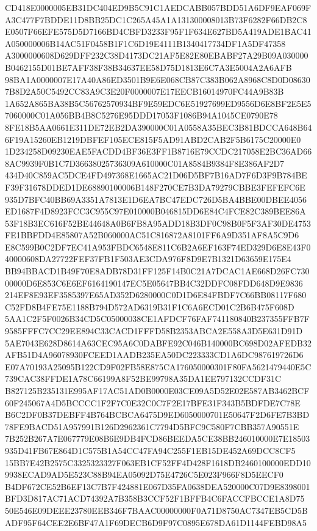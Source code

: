 \documentclass[UTF8,fontset=fandol,zihao=-4,a4paper]{ctexart}
\begin{document}
{{CD418E0000005EB31DC404ED9B5C91C1AEDCABB057BDD51A6DF9EAF069FA3C477F7BDDE11D8BB25DC1C265A45A1A131300008013B73F6282F66DB2C8
E0507F66EFE575D5D7166BD4CBFD3233F95F1F634E627BD5A419ADE1BAC41A050000006B14AC51F0458B1F1C6D19E4111B1340417734DF1A5DF47358
A3000000608D629DFF232C38D4173DC21AF5E82E80EBABF27A29B09A030000B0462155D01BE7AFF38F38B34637EE58D75D1813E6C7A3E5004A2A6AFB
98BA1A0000007E17A40A86ED3501B9E6E068CB87C383B062A8968C8D0D086307B8D2A50C5492CC83A9C3E20F0000007E17EECB16014970FC44A9B83B
1A652A865BA38B5C56762570934BF9E59EDC6E51927699ED9556D6E8BF2E5E57060000C01A056BB4B8C5276E95DDD17053F1086B94A1045CE0790E78
8FE18B5AA0661E311DE72EB2DA390000C01A0558A35BEC3B81BDCCA648B646F19A15260EB1219DBFEF105ECE815F5AD91ABD2CAB2F5B6175C20000E0
1D234258D09230EAE5FACDD4BF36E3FF1B8716E79CCDC217058E2BC36AD668AC9939F0B1C7D36638025736309A610000C01A8584B9384F8E386AF2D7
434D40C859AC5DCE4FD497368E1665AC21D06D5BF7B16AD7F6D3F9B784BEF39F31678DDED1DE68890100006B148F270CE7B3DA79279CBBE3FEFEFC6E
935D7BFC40BB69A3351A7813E1D6EA7BC47EDC726D5BA4BBE00DBEE4056ED1687F4D8923FCC3C955C97E010000B046815DD6E84C4FCE82C389BEE86A
53F18B3EC616F52BE44648A0B6FB8A95ADD18B3DF0C98B0F5F3AF30DE4753FE1BBFDD4E85807A52B060000AC51C816872A8101FF6A9D351AF8A5C9D6
E8C599B0C2DF7EC41A953FBDC6548E811C6B2A6EF163F74ED329D6E8E43F040000608DA27722FEF37FB1F503AE3CDA976F8D9E7B1321D63659E175E4
BB94BBACD1B49F70E8ADB78D31FF125F14B0C21A7DCAC1AE668D26FC73000000D6E853C6E6EF6164190147EC5E05647BB4C32DDFC08FDD648D9E9836
214EF8E93EF3585397E65AD352D6280000C0D1D6E84FBDF7C66BB08117F680C52FD8B4FE75E1188B794D572AD6319B31F1C6A6ECD01C2B6B475F608D
5AA1C2F5F0026B34CD5C05000038CE1AFDCF76FAF741180840B237355FFB7F9585FFFC7CC29EE894C33CACD1FFFD58B2353ABCA2E558A3D5E631D91D
5AE7043E628D8614A63CEC95A6C0DABFE92C046B140000BC698D02AFEDB32AFB51D4A96078930FCEED1AADB235EA50DC223333CD1A6DC987619726D6
E07A70193A25095B122CD9F02FB58E875CA176050000301F80FA5621479440E5C739CAC38FFDE1A78C66199A8F52BE99798A35DA1EE797132CCDF31C
B827125B235131E995AF17AC51AD0B0000E03CE09A5D52E02E587AB3462BCF60F245067A4D5BCCCC1F2F7C0E32C0C7F2E17BFE31F343B5BDFDE7C78E
B6C2DF0B37DEBFF4B764BCBCA6475D9ED6050000701E50647F2D6FE7B3BD78FE9BACD51A957991B126D2962361C7794D5BFC9C580F7CBB357A90551E
7B252B267A7E067779E08B6E9DB4FCD86BEEDA5CE38BB246010000E7E18503935D41FB67E864D1C575B1A54CC47FA94C255F1EB15DE452A69DCC8CF5
15BB7E42B2575C3325323327F063EB1CF52FF4D428F1618DB2460100000EDD109938ECAD9AD5E523C88B94EA05092D75E4726C5E023F966F8D5EECF0
B4DF672CE52B6EF13C7B7F424881E067D35FA0638DEA520000C07D9E8398001BFD3D817AC71ACD74392A7B358B3CCF52F1BFFB4C6FACCFBCCE1A8D75
50E546E09DEEE23780EEB346F7BAAC00000000F0A71D8750AC7347EB5CD5BADF95F64CEE2E6BF47A1F69DECB6D9F97C0895E678DA61D1144FEBD98A5
}}
\end{document}
